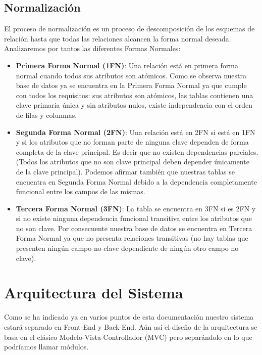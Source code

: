 \subsection{Normalización}

El proceso de normalización es un proceso de descomposición de los esquemas de relación hasta que
todas las relaciones alcancen la forma normal deseada.\cite{normalizacion} Analizaremos por tantos las diferentes Formas Normales:

\vspace{-0.5em}
\begin{itemize}
    \item \textbf{Primera Forma Normal (1FN)}: Una relación está en primera forma normal cuando todos sus atributos son atómicos.\cite{1fn} Como se observa nuestra base de datos ya se encuentra en la Primera Forma Normal ya que cumple con todos los requisitos: sus atributos son atómicos, las tablas contienen una clave primaria única y sin atributos nulos, existe independencia con el orden de filas y columnas.

    \item \textbf{Segunda Forma Normal (2FN)}: Una relación está en 2FN si está en 1FN y si los atributos que no forman parte de ninguna clave dependen de forma completa de la clave principal. Es decir que no existen dependencias parciales. (Todos los atributos que no son clave principal deben depender únicamente de la clave principal).\cite{2fn} Podemos afirmar también que nuestras tablas se encuentra en Segunda Forma Normal debido a la dependencia completamente funcional entre los campos de las mismas.

    \item \textbf{Tercera Forma Normal (3FN)}: La tabla se encuentra en 3FN si es 2FN y si no existe ninguna dependencia funcional transitiva entre los atributos que no son clave.\cite{3fn} Por consecuente nuestra base de datos se encuentra en Tercera Forma Normal ya que no presenta relaciones transitivas (no hay tablas que presenten ningún campo no clave dependiente de ningún otro campo no clave).
\end{itemize}

\section{Arquitectura del Sistema}

Como se ha indicado ya en varios puntos de esta documentación nuestro sistema estará separado en Front-End y Back-End. Aún así el diseño de la arquitectura se basa en el clásico Modelo-Vista-Controllador (MVC) pero separándolo en lo que podríamos llamar módulos.

